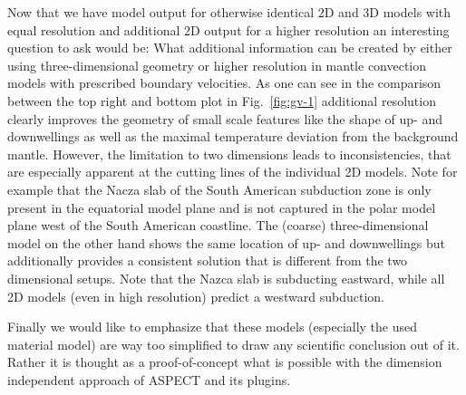 \documentclass{article}
\newcommand{\aspect}{\textsc{ASPECT}}
\begin{document}
Now that we have model output for otherwise identical 2D and 3D models with equal resolution and additional 2D output
for a higher resolution an interesting question to ask would be: What additional information can be created by
either using three-dimensional geometry or higher resolution in mantle convection models with prescribed boundary velocities.
As one can see in the comparison between the top right and bottom plot in Fig.~\ref{fig:gv-1} additional resolution clearly
improves the geometry of small scale features like the shape of up- and downwellings as well as the maximal temperature
deviation from the background mantle. However, the limitation to two dimensions leads to inconsistencies, 
that are especially apparent at the cutting lines of the individual 2D models. 
Note for example that the Nacza slab of the South American subduction zone is only
present in the equatorial model plane and is not captured in the polar model plane west 
of the South American coastline. The (coarse) three-dimensional model on the other hand
shows the same location of up- and downwellings but additionally provides a consistent solution
that is different from the two dimensional setups. Note that the Nazca slab is subducting eastward,
while all 2D models (even in high resolution) predict a westward subduction.

Finally we would like to emphasize that these models (especially the used material model)
are way too simplified to draw any scientific conclusion out of it. Rather it is thought
as a proof-of-concept what is possible with the dimension independent approach of
\aspect{} and its plugins.
\end{document}
